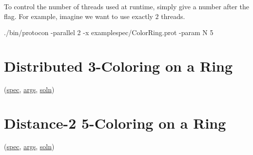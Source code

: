 To control the number of threads used at runtime, simply give a number after the  flag.
For example, imagine we want to use exactly $2$ threads.

\begin{code}
./bin/protocon -parallel 2 -x examplespec/ColorRing.prot -param N 5
\end{code}

\section{Distributed 3-Coloring on a Ring}
\label{sec:ColorRingDistrib}

(\href{\examplespec/ColorRingDistrib.prot}{spec},
\href{\examplesett/ColorRingDistrib.args}{args},
\href{\examplesoln/ColorRingDistrib.prot}{soln})

\section{Distance-2 5-Coloring on a Ring}
\label{sec:ColorRingLocal}

(\href{\examplespec/ColorRingLocal.prot}{spec},
\href{\examplesett/ColorRingLocal.args}{args},
\href{\examplesoln/ColorRingLocal.prot}{soln})



